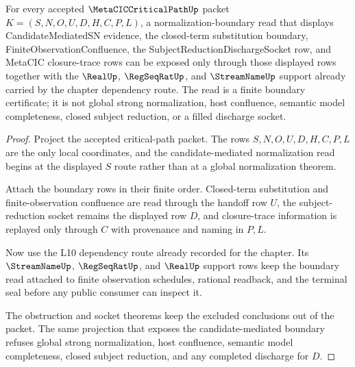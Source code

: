 \begin{theorem}
\label{thm:metaciccriticalpath-candidate-mediated-sn-boundary}
For every accepted $\MetaCICCriticalPathUp$ packet $K=(S,N,O,U,D,H,C,P,L)$, a normalization-boundary read that displays CandidateMediatedSN evidence, the closed-term substitution boundary, FiniteObservationConfluence, the SubjectReductionDischargeSocket row, and MetaCIC closure-trace rows can be exposed only through those displayed rows together with the $\RealUp$, $\RegSeqRatUp$, and $\StreamNameUp$ support already carried by the chapter dependency route. The read is a finite boundary certificate; it is not global strong normalization, host confluence, semantic model completeness, closed subject reduction, or a filled discharge socket.
\end{theorem}
\begin{proof}
Project the accepted critical-path packet. The rows $S,N,O,U,D,H,C,P,L$ are the only local coordinates, and the candidate-mediated normalization read begins at the displayed $S$ route rather than at a global normalization theorem.

Attach the boundary rows in their finite order. Closed-term substitution and finite-observation confluence are read through the handoff row $U$, the subject-reduction socket remains the displayed row $D$, and closure-trace information is replayed only through $C$ with provenance and naming in $P,L$.

Now use the L10 dependency route already recorded for the chapter. Its $\StreamNameUp$, $\RegSeqRatUp$, and $\RealUp$ support rows keep the boundary read attached to finite observation schedules, rational readback, and the terminal seal before any public consumer can inspect it.

The obstruction and socket theorems keep the excluded conclusions out of the packet. The same projection that exposes the candidate-mediated boundary refuses global strong normalization, host confluence, semantic model completeness, closed subject reduction, and any completed discharge for $D$.
\end{proof}

